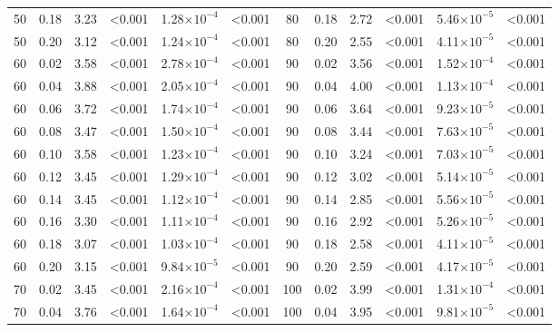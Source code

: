 \documentclass[12pt]{article}
\begin{document}
\begin{table}[h!]
\begin{tabular}{c c | c c| c c ||c c | c c | c c |}
        50	&	0.18	&	3.23	&	\textless0.001	&	1.28$\times10^{-4}$	&	\textless0.001	&	80	&	0.18	&	2.72	&	\textless0.001	&	5.46$\times10^{-5}$	&	\textless0.001	\\
        50	&	0.20	&	3.12	&	\textless0.001	&	1.24$\times10^{-4}$	&	\textless0.001	&	80	&	0.20	&	2.55	&	\textless0.001	&	4.11$\times10^{-5}$	&	\textless0.001	\\
        60	&	0.02	&	3.58	&	\textless0.001	&	2.78$\times10^{-4}$	&	\textless0.001	&	90	&	0.02	&	3.56	&	\textless0.001	&	1.52$\times10^{-4}$	&	\textless0.001	\\
        60	&	0.04	&	3.88	&	\textless0.001	&	2.05$\times10^{-4}$	&	\textless0.001	&	90	&	0.04	&	4.00	&	\textless0.001	&	1.13$\times10^{-4}$	&	\textless0.001	\\
        60	&	0.06	&	3.72	&	\textless0.001	&	1.74$\times10^{-4}$	&	\textless0.001	&	90	&	0.06	&	3.64	&	\textless0.001	&	9.23$\times10^{-5}$	&	\textless0.001	\\
        60	&	0.08	&	3.47	&	\textless0.001	&	1.50$\times10^{-4}$	&	\textless0.001	&	90	&	0.08	&	3.44	&	\textless0.001	&	7.63$\times10^{-5}$	&	\textless0.001	\\
        60	&	0.10	&	3.58	&	\textless0.001	&	1.23$\times10^{-4}$	&	\textless0.001	&	90	&	0.10	&	3.24	&	\textless0.001	&	7.03$\times10^{-5}$	&	\textless0.001	\\
        60	&	0.12	&	3.45	&	\textless0.001	&	1.29$\times10^{-4}$	&	\textless0.001	&	90	&	0.12	&	3.02	&	\textless0.001	&	5.14$\times10^{-5}$	&	\textless0.001	\\
        60	&	0.14	&	3.45	&	\textless0.001	&	1.12$\times10^{-4}$	&	\textless0.001	&	90	&	0.14	&	2.85	&	\textless0.001	&	5.56$\times10^{-5}$	&	\textless0.001	\\
        60	&	0.16	&	3.30	&	\textless0.001	&	1.11$\times10^{-4}$	&	\textless0.001	&	90	&	0.16	&	2.92	&	\textless0.001	&	5.26$\times10^{-5}$	&	\textless0.001	\\
        60	&	0.18	&	3.07	&	\textless0.001	&	1.03$\times10^{-4}$	&	\textless0.001	&	90	&	0.18	&	2.58	&	\textless0.001	&	4.11$\times10^{-5}$	&	\textless0.001	\\
        60	&	0.20	&	3.15	&	\textless0.001	&	9.84$\times10^{-5}$	&	\textless0.001	&	90	&	0.20	&	2.59	&	\textless0.001	&	4.17$\times10^{-5}$	&	\textless0.001	\\
        70	&	0.02	&	3.45	&	\textless0.001	&	2.16$\times10^{-4}$	&	\textless0.001	&	100	&	0.02	&	3.99	&	\textless0.001	&	1.31$\times10^{-4}$	&	\textless0.001	\\
        70	&	0.04	&	3.76	&	\textless0.001	&	1.64$\times10^{-4}$	&	\textless0.001	&	100	&	0.04	&	3.95	&	\textless0.001	&	9.81$\times10^{-5}$	&	\textless0.001	\\

\end{tabular}
\end{table}
\end{document}
